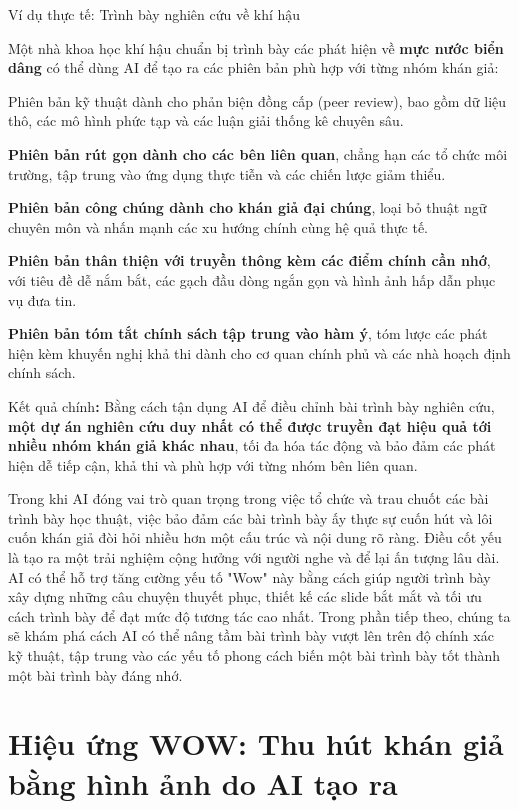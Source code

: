 \begin{examplebox}{Ví dụ thực tế: Trình bày nghiên cứu về khí hậu}

Một nhà khoa học khí hậu chuẩn bị trình bày các phát hiện về \textbf{mực nước biển dâng} có thể dùng AI để tạo ra các phiên bản phù hợp với từng nhóm khán giả:

Phiên bản kỹ thuật dành cho phản biện đồng cấp (peer review), bao gồm dữ liệu thô, các mô hình phức tạp và các luận giải thống kê chuyên sâu.

\textbf{Phiên bản rút gọn dành cho các bên liên quan}, chẳng hạn các tổ chức môi trường, tập trung vào ứng dụng thực tiễn và các chiến lược giảm thiểu.

\textbf{Phiên bản công chúng dành cho khán giả đại chúng}, loại bỏ thuật ngữ chuyên môn và nhấn mạnh các xu hướng chính cùng hệ quả thực tế.

\textbf{Phiên bản thân thiện với truyền thông kèm các điểm chính cần nhớ}, với tiêu đề dễ nắm bắt, các gạch đầu dòng ngắn gọn và hình ảnh hấp dẫn phục vụ đưa tin.

\textbf{Phiên bản tóm tắt chính sách tập trung vào hàm ý}, tóm lược các phát hiện kèm khuyến nghị khả thi dành cho cơ quan chính phủ và các nhà hoạch định chính sách.

Kết quả chính\textbf{:} Bằng cách tận dụng AI để điều chỉnh bài trình bày nghiên cứu, \textbf{một dự án nghiên cứu duy nhất có thể được truyền đạt hiệu quả tới nhiều nhóm khán giả khác nhau}, tối đa hóa tác động và bảo đảm các phát hiện dễ tiếp cận, khả thi và phù hợp với từng nhóm bên liên quan.

Trong khi AI đóng vai trò quan trọng trong việc tổ chức và trau chuốt các bài trình bày học thuật, việc bảo đảm các bài trình bày ấy thực sự cuốn hút và lôi cuốn khán giả đòi hỏi nhiều hơn một cấu trúc và nội dung rõ ràng. Điều cốt yếu là tạo ra một trải nghiệm cộng hưởng với người nghe và để lại ấn tượng lâu dài. AI có thể hỗ trợ tăng cường yếu tố "Wow" này bằng cách giúp người trình bày xây dựng những câu chuyện thuyết phục, thiết kế các slide bắt mắt và tối ưu cách trình bày để đạt mức độ tương tác cao nhất. Trong phần tiếp theo, chúng ta sẽ khám phá cách AI có thể nâng tầm bài trình bày vượt lên trên độ chính xác kỹ thuật, tập trung vào các yếu tố phong cách biến một bài trình bày tốt thành một bài trình bày đáng nhớ.

\end{examplebox}

\section{Hiệu ứng WOW: Thu hút khán giả bằng hình ảnh do AI tạo ra}

